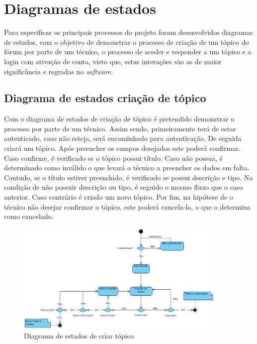 \section{Diagramas de estados}
Para especificar os principais processos do projeto foram desenvolvidos diagramas de estados, com o objetivo de demonstrar o processo de criação de um tópico do fórum por parte de um técnico, o processo de aceder e responder a um tópico e o login com ativação de conta, visto que, estas interações são as de maior significância e regradas no \textit{software}.

\subsection{Diagrama de estados criação de tópico}

Com o diagrama de estados de criação de tópico é pretendido demonstrar o processo por parte de um técnico. Assim sendo, primeiramente terá de estar autenticado, caso não esteja, será encaminhado para autenticação. De seguida criará um tópico. Após preencher os campos desejados este poderá confirmar. Caso confirme, é verificado se o tópico possui título. Caso não possua, é determinado como inválido o que levará o técnico a preencher os dados em falta. Contudo, se o título estiver preenchido, é verificado se possui descrição e tipo. Na condição de não possuir descrição ou tipo, é seguido o mesmo fluxo que o caso anterior. Caso contrário é criado um novo tópico. Por fim, na hipótese de o técnico não desejar confirmar o tópico, este poderá cancela-lo, o que o determina como cancelado.

\begin{figure}[htb]
  \centering
  \includegraphics[width=0.9\textwidth]{images/diagramas/estados/criar_topico.png}
  \caption{Diagrama de estados de criar tópico}
  \label{fig:40}
\end{figure}

